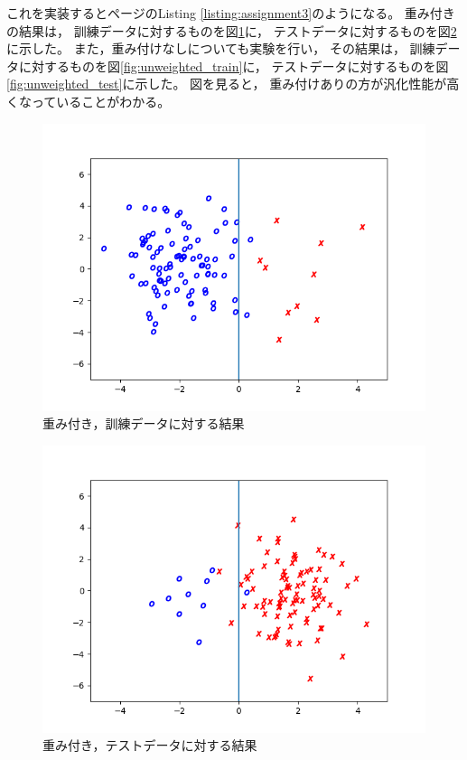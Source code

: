 \documentclass[class=jsarticle, crop=false, dvipdfmx, fleqn]{standalone}
\begin{document}
これを実装すると\pageref{listing:assignment3}ページのListing \ref{listing:assignment3}のようになる。
重み付きの結果は，
訓練データに対するものを図\ref{fig:weighted_train}に，
テストデータに対するものを図\ref{fig:weighted_test}に示した。
また，重み付けなしについても実験を行い，
その結果は，
訓練データに対するものを図\ref{fig:unweighted_train}に，
テストデータに対するものを図\ref{fig:unweighted_test}に示した。
図を見ると，
重み付けありの方が汎化性能が高くなっていることがわかる。


\begin{figure}[H]
    \centering
    \includegraphics[clip, width=12cm]{../figures/assignment3_result_weighted_train}
    \caption{重み付き，訓練データに対する結果}
    \label{fig:weighted_train}
\end{figure}

\begin{figure}[H]
    \centering
    \includegraphics[clip, width=12cm]{../figures/assignment3_result_weighted_test}
    \caption{重み付き，テストデータに対する結果}
    \label{fig:weighted_test}
\end{figure}
\end{document}
